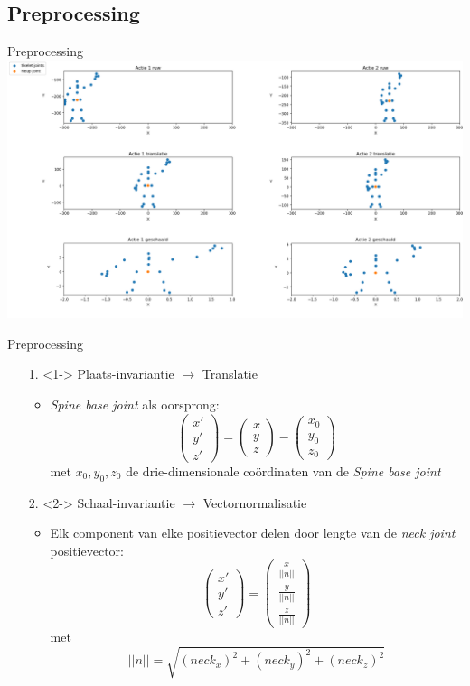 \documentclass[]{beamer}
\begin{document}
	\subsection{Preprocessing}
	\begin{frame}{Preprocessing}
	\includegraphics[width=\textwidth]{skeleton_preprocessing}
\end{frame}
	\begin{frame}{Preprocessing}
		\begin{enumerate}
			\item[1.]<1-> Plaats-invariantie $\rightarrow$ Translatie
			\begin{itemize}
				\item \textit{Spine base joint} als oorsprong:
				$$\begin{pmatrix}
				x' \\
				y' \\
				z'
				\end{pmatrix}
				= \begin{pmatrix}
				x \\ y \\ z
				\end{pmatrix}
				- \begin{pmatrix}
				x_0 \\ y_0 \\ z_0
				\end{pmatrix}$$
				met $x_0, y_0, z_0$ de drie-dimensionale coördinaten van de \textit{Spine base joint}
			\end{itemize}
			\item[2.]<2-> Schaal-invariantie $\rightarrow$ Vectornormalisatie 
			\begin{itemize}
				\item Elk component van elke positievector delen door lengte van de \textit{neck joint} positievector:
				$$
				\begin{pmatrix}
				x' \\ y' \\ z'
				\end{pmatrix}
				=				
				\begin{pmatrix}
				\frac{x}{||n||} \\ \frac{y}{||n||}  \\ \frac{z}{||n||} 
				\end{pmatrix}
				$$
				met $$||n|| = \sqrt{(neck_x)^2 + (neck_y)^2 + (neck_z)^2}$$
			\end{itemize}
		\end{enumerate}
	\end{frame}
\end{document}
